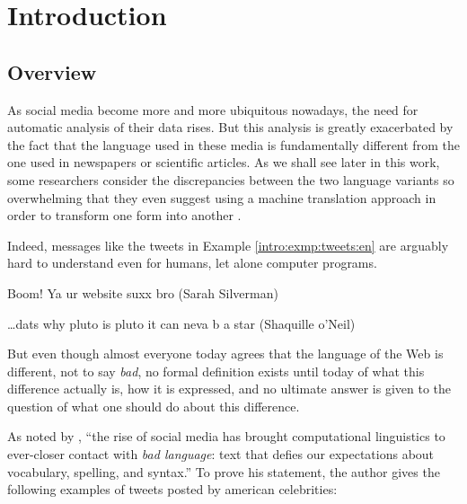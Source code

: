

\chapter{Introduction}

\section{Overview}
As social media become more and more ubiquitous nowadays, the need for
automatic analysis of their data rises.  But this analysis is greatly
exacerbated by the fact that the language used in these media is fundamentally
different from the one used in newspapers or scientific articles.  As we shall
see later in this work, some researchers consider the discrepancies between
the two language variants so overwhelming that they even suggest using a
machine translation approach in order to transform one form into another
\citep[cf.][]{Aw:06,Pennell:11}.

Indeed, messages like the tweets in Example \ref{intro:exmp:tweets:en} are
arguably hard to understand even for humans, let alone computer programs.
\begin{example}\label{intro:exmp:tweets:en}
Boom! Ya ur website suxx bro {\upshape (Sarah Silverman)}

\dots dats why pluto is pluto it can neva b a star {\upshape (Shaquille o'Neil)}
\end{example}
But even though almost everyone today agrees that the language of the Web is
different, not to say \emph{bad}, no formal definition exists until today of
what this difference actually is, how it is expressed, and no ultimate answer
is given to the question of what one should do about this difference.


As noted by \cite{Eisenstein:13}, ``the rise of social media has brought
computational linguistics to ever-closer contact with \emph{bad language}:
text that defies our expectations about vocabulary, spelling, and syntax.''
To prove his statement, the author gives the following examples of tweets
posted by american celebrities:

